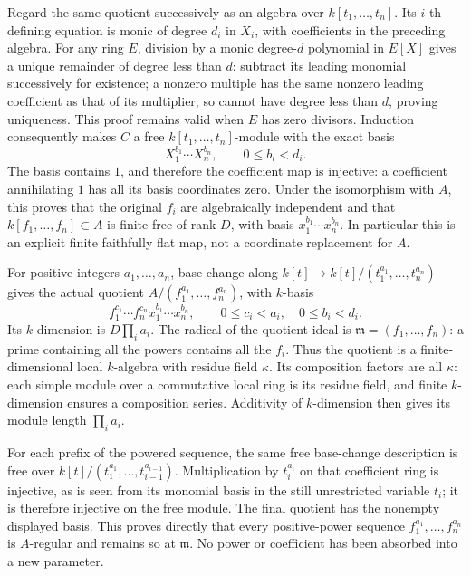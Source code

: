 Regard the same quotient successively as an algebra over \(k[t_1,\ldots,t_n]\). Its \(i\)-th defining equation is monic of degree \(d_i\) in \(X_i\), with coefficients in the preceding algebra. For any ring \(E\), division by a monic degree-\(d\) polynomial in \(E[X]\) gives a unique remainder of degree less than \(d\): subtract its leading monomial successively for existence; a nonzero multiple has the same nonzero leading coefficient as that of its multiplier, so cannot have degree less than \(d\), proving uniqueness. This proof remains valid when \(E\) has zero divisors. Induction consequently makes \(C\) a free \(k[t_1,\ldots,t_n]\)-module with the exact basis \[
 X_1^{b_1}\cdots X_n^{b_n},\qquad 0\leq b_i<d_i.
\] The basis contains \(1\), and therefore the coefficient map is injective: a coefficient annihilating \(1\) has all its basis coordinates zero. Under the isomorphism with \(A\), this proves that the original \(f_i\) are algebraically independent and that \(k[f_1,\ldots,f_n]\subset A\) is finite free of rank \(D\), with basis \(x_1^{b_1}\cdots x_n^{b_n}\). In particular this is an explicit finite faithfully flat map, not a coordinate replacement for \(A\).

For positive integers \(a_1,\ldots,a_n\), base change along \(k[t]\to k[t]/(t_1^{a_1},\ldots,t_n^{a_n})\) gives the actual quotient \(A/(f_1^{a_1},\ldots,f_n^{a_n})\), with \(k\)-basis \[
 f_1^{c_1}\cdots f_n^{c_n}x_1^{b_1}\cdots x_n^{b_n},
 \qquad 0\leq c_i<a_i,\quad 0\leq b_i<d_i.
\] Its \(k\)-dimension is \(D\prod_i a_i\). The radical of the quotient ideal is \(\mathfrak m=(f_1,\ldots,f_n)\): a prime containing all the powers contains all the \(f_i\). Thus the quotient is a finite-dimensional local \(k\)-algebra with residue field \(\kappa\). Its composition factors are all \(\kappa\): each simple module over a commutative local ring is its residue field, and finite \(k\)-dimension ensures a composition series. Additivity of \(k\)-dimension then gives its module length \(\prod_i a_i\).

For each prefix of the powered sequence, the same free base-change description is free over \(k[t]/(t_1^{a_1},\ldots,t_{i-1}^{a_{i-1}})\). Multiplication by \(t_i^{a_i}\) on that coefficient ring is injective, as is seen from its monomial basis in the still unrestricted variable \(t_i\); it is therefore injective on the free module. The final quotient has the nonempty displayed basis. This proves directly that every positive-power sequence \(f_1^{a_1},\ldots,f_n^{a_n}\) is \(A\)-regular and remains so at \(\mathfrak m\). No power or coefficient has been absorbed into a new parameter.

